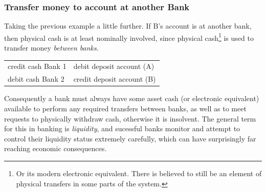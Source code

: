 \documentclass[10pt,oneside,openright, a4paper]{memoir}
\begin{document}
\subsubsection{Transfer money to account at another Bank}
Taking the previous example a little further. If B's
account is at another bank, then physical cash is at
least nominally involved, since physical cash\footnote{Or its
modern electronic equivalent. There is believed to still be
an element of physical transfers in some parts of the system.}
is used to transfer money \emph{between banks}.
\begin{table}[ht]
\centering
\begin{tabular}{ll}
credit cash Bank 1 & debit deposit account (A)\\
debit cash Bank 2 & credit deposit account (B)\\
\end{tabular}
\end{table}
Consequently a bank must always have some asset 
cash (or electronic equivalent) available to perform 
any required transfers between banks, as well as to meet requests
to physically withdraw cash, otherwise it is insolvent.
The general term for this in banking is \emph{liquidity}, and
sucessful banks monitor and attempt to control their liquidity status
extremely carefully, which can have surprisingly far
reaching economic consequences.
\end{document}

